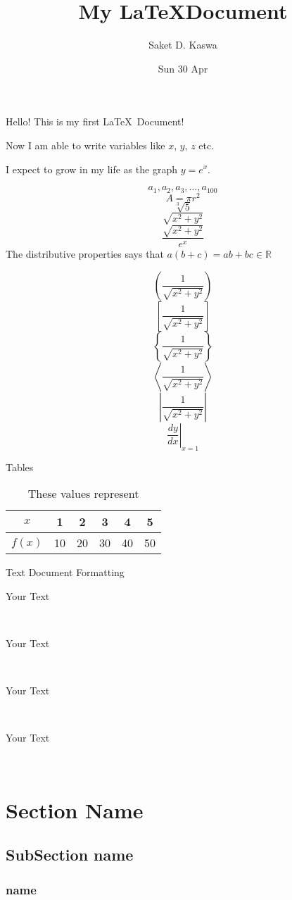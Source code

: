 \documentclass[11pt]{article}
\title{My \LaTeX Document}
\author{Saket D. Kaswa}
\date{Sun 30 Apr}
\begin{document}
\tableofcontents
\maketitle
Hello! This is my first \LaTeX\ Document!

Now I am able to write variables like $x$, $y$, $z$ etc.

I expect to grow in my life as the graph $y=e^x$. 

$$a_1,a_2,a_3,\ldots,a_{100}$$
$$A= \pi r^2$$
$$ \sqrt[3]{5} $$
$$ \sqrt{x^2+y^2} $$
$$ \frac{\sqrt{x^2+y^2}}{e^x}$$
The distributive properties says that $a(b+c)=ab+bc \in \mathbb{R}$

$$\left(\frac{1}{\sqrt{x^2+y^2}}\right)$$
$$\left[\frac{1}{\sqrt{x^2+y^2}}\right]$$
$$\left\{\frac{1}{\sqrt{x^2+y^2}}\right\}$$
$$\left \langle   \frac{1}{\sqrt{x^2+y^2}}  \right \rangle$$
$$\left | \frac{1}{\sqrt{x^2+y^2}}\right |$$
$$\left. \frac{dy}{dx} \right |_{x=1}$$

Tables\\
\begin{table}
\centering
\def\arraystretch{1.5}
\begin{tabular}{|c||c|c|c|c|c|} \hline
$x$ & 1 & 2 & 3 & 4 & 5 \\ \hline
$f(x)$ & 10 & 20 & 30 & 40 &50\\ \hline
\end{tabular}
\caption{These values represent}
\end{table}

\vspace{5pt}

Text Document Formatting\\
\vspace{1cm}
\begin{large}Your Text\end{large}\\
\vspace{1cm}
\begin{Large}Your Text\end{Large}\\
\vspace{1cm}
\begin{huge}Your Text\end{huge}\\
\vspace{1cm}
\begin{Huge}Your Text\end{Huge}\\  

\section{Section Name}
    \subsection{SubSection name}
        \subsubsection{name}
\end{document}
